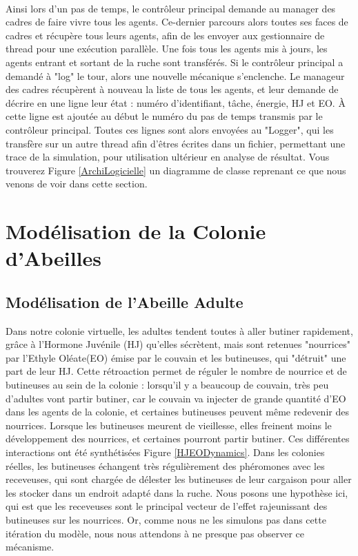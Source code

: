 			
			\paragraph{}
			Ainsi lors d'un pas de temps, le contrôleur principal demande au manager des cadres de faire vivre tous les agents. Ce-dernier parcours alors toutes ses faces de cadres et récupère tous leurs agents, afin de les envoyer aux gestionnaire de thread pour une exécution parallèle. Une fois tous les agents mis à jours, les agents entrant et sortant de la ruche sont transférés. Si le contrôleur principal a demandé à "log" le tour, alors une nouvelle mécanique s'enclenche. Le manageur des cadres récupèrent à nouveau la liste de tous les agents, et leur demande de décrire en une ligne leur état : numéro d'identifiant, tâche, énergie, HJ et EO. À cette ligne est ajoutée au début le numéro du pas de temps transmis par le contrôleur principal. Toutes ces lignes sont alors envoyées au "Logger", qui les transfère sur un autre thread afin d'êtres écrites dans un fichier, permettant une trace de la simulation, pour utilisation ultérieur en analyse de résultat. Vous trouverez Figure \ref{ArchiLogicielle} un diagramme de classe reprenant ce que nous venons de voir dans cette section.

	\section{Modélisation de la Colonie d'Abeilles}
	\label{sectionModelColonie}
		\subsection{Modélisation de l'Abeille Adulte}
		
		Dans notre colonie virtuelle, les adultes tendent toutes à aller butiner rapidement, grâce à l'Hormone Juvénile (HJ) qu'elles sécrètent, mais sont retenues "nourrices" par l'Ethyle Oléate(EO) émise par le couvain et les butineuses, qui "détruit" une part de leur HJ. Cette rétroaction permet de réguler le nombre de nourrice et de butineuses au sein de la colonie : lorsqu'il y a beaucoup de couvain, très peu d'adultes vont partir butiner, car le couvain va injecter de grande quantité d'EO dans les agents de la colonie, et certaines butineuses peuvent même redevenir des nourrices. Lorsque les butineuses meurent de vieillesse, elles freinent moins le développement des nourrices, et certaines pourront partir butiner. Ces différentes interactions ont été synthétisées Figure \ref{HJEODynamics}. Dans les colonies réelles, les butineuses échangent très régulièrement des phéromones avec les receveuses, qui sont chargée de délester les butineuses de leur cargaison pour aller les stocker dans un endroit adapté dans la ruche. Nous posons une hypothèse ici, qui est que les receveuses sont le principal vecteur de l'effet rajeunissant des butineuses sur les nourrices. Or, comme nous ne les simulons pas dans cette itération du modèle, nous nous attendons à ne presque pas observer ce mécanisme.
		

